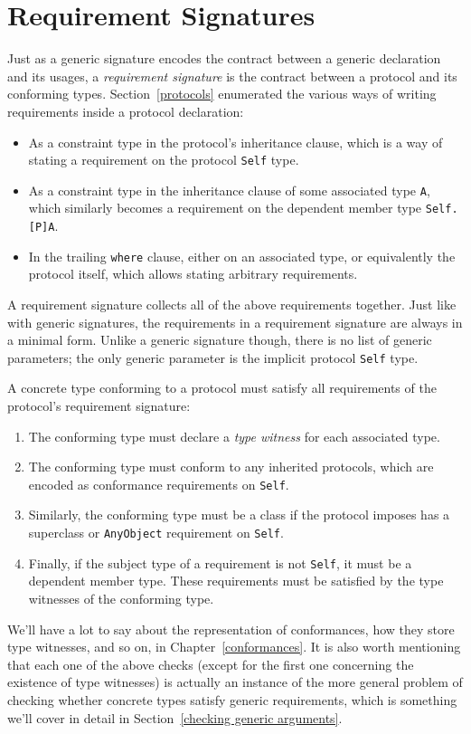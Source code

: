 \documentclass[../generics]{subfiles}
\begin{document}
\section{Requirement Signatures}\label{requirement sig}

Just as a generic signature encodes the contract between a generic declaration and its usages, a \emph{requirement signature} is the contract between a protocol and its conforming types. Section~\ref{protocols} enumerated the various ways of writing requirements inside a protocol declaration:
\begin{itemize}
\item As a constraint type in the protocol's inheritance clause, which is a way of stating a requirement on the protocol \texttt{Self} type.
\item As a constraint type in the inheritance clause of some associated type \texttt{A}, which similarly becomes a requirement on the dependent member type \texttt{Self.[P]A}.
\item In the trailing \texttt{where} clause, either on an associated type, or equivalently the protocol itself, which allows stating arbitrary requirements.
\end{itemize}

A requirement signature collects all of the above requirements together. Just like with generic signatures, the requirements in a requirement signature are always in a minimal form. Unlike a generic signature though, there is no list of generic parameters; the only generic parameter is the implicit protocol \texttt{Self} type.

A concrete type conforming to a protocol must satisfy all requirements of the protocol's requirement signature:
\begin{enumerate}
\item The conforming type must declare a \emph{type witness} for each associated type.
\item The conforming type must conform to any inherited protocols, which are encoded as conformance requirements on \texttt{Self}.
\item Similarly, the conforming type must be a class if the protocol imposes has a superclass or \texttt{AnyObject} requirement on \texttt{Self}.
\item Finally, if the subject type of a requirement is not \texttt{Self}, it must be a dependent member type. These requirements must be satisfied by the type witnesses of the conforming type.
\end{enumerate}
We'll have a lot to say about the representation of conformances, how they store type witnesses, and so on, in Chapter~\ref{conformances}. It is also worth mentioning that each one of the above checks (except for the first one concerning the existence of type witnesses) is actually an instance of the more general problem of checking whether concrete types satisfy generic requirements, which is something we'll cover in detail in Section~\ref{checking generic arguments}.
\end{document}
